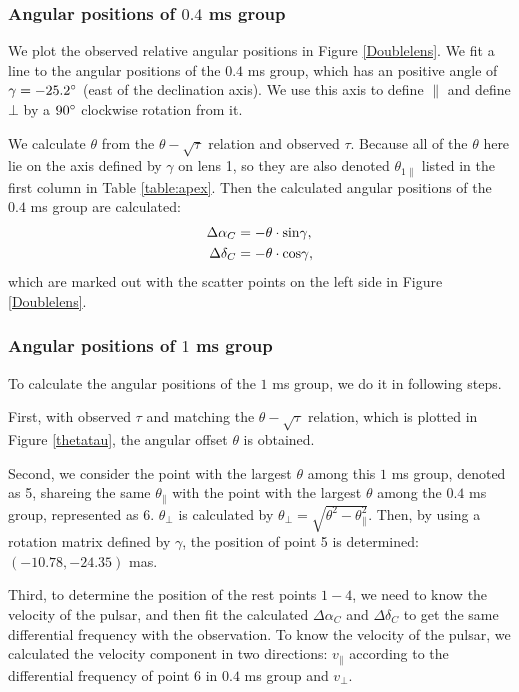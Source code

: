 \documentclass[useAMS,usenatbib]{mn2e}
\begin{document}
\subsubsection{Angular positions of $0.4$ ms group}
We plot the observed relative angular positions in Figure \ref{Doublelens}. We fit a line to the angular positions of the $0.4$ ms group, which has an positive angle of $\gamma=-25.2\degree$ (east of the declination axis). We use this axis to define ${\parallel}$ and define ${\bot}$ by a $90\degree$ clockwise rotation from it. 

We calculate $\theta$ from the $\theta-\sqrt{\tau}$ relation and observed $\tau$. Because all of the $\theta$ here lie on the axis defined by $\gamma$ on lens 1, so they are also denoted $\theta_{1\parallel}$ listed in the first column in Table \ref{table:apex}. Then the calculated angular positions of the $0.4$ ms group are calculated:
\begin{align*}
{\Delta\alpha_C}&=-\theta \cdot {\rm sin}\gamma, \\
{\Delta\delta_C}&=-\theta \cdot {\rm cos}\gamma,
\end{align*}
which are marked out with the scatter points on the left side in Figure \ref{Doublelens}.


\subsubsection{Angular positions of $1$ ms group}
To calculate the angular positions of the $1$ ms group, we do it in following steps. 

First, with observed $\tau$ and matching the $\theta-\sqrt{\tau}$ relation, which is plotted in Figure \ref{thetatau}, the angular offset $\theta$ is obtained. 

Second, we consider the point with the largest $\theta$ among this $1$ ms group, denoted as 5, shareing the same $\theta_{\parallel}$ with the point with the largest $\theta$ among the $0.4$ ms group, represented as 6. $\theta_{\bot}$ is calculated by $\theta_{\bot}=\sqrt{\theta^2-\theta_{\parallel} ^2} $. Then, by using a rotation matrix defined by $\gamma$, the position of point 5 is determined: $(-10.78,-24.35)$ mas. 

Third, to determine the position of the rest points $1-4$, we need to know the velocity of the pulsar, and then fit the calculated $\Delta\alpha_C$ and $\Delta\delta_C$ to get the same differential frequency with the observation. To know the velocity of the pulsar, we calculated the velocity component in two directions: ${v_\parallel}$ according to the differential frequency of point $6$ in $0.4$ ms group and ${v_\bot}$.
\end{document}
